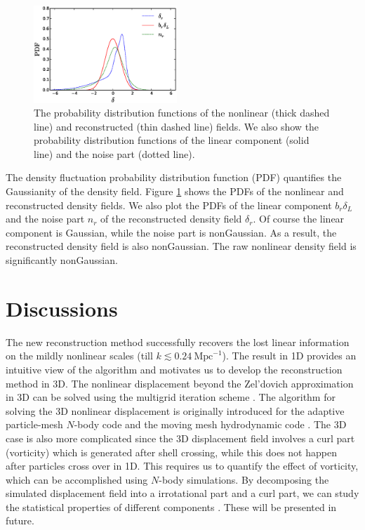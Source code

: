 \documentclass[aps,prd,twocolumn,showpacs,superscriptaddress,groupedaddress,nofootinbib]{revtex4}  %
\newcommand{\mr}{\mathrm}
\begin{document}
\begin{figure}[tbp]
\begin{center}
\includegraphics[width=0.48\textwidth]{f8x.eps}
\end{center}
\vspace{-0.7cm}
\caption{The probability distribution functions of the nonlinear (thick dashed 
line) and reconstructed (thin dashed line) fields. 
We also show the probability distribution functions of the linear component 
(solid line) and the noise part (dotted line).}
\label{fig:pdf}
\end{figure}

The density fluctuation probability distribution function (PDF) quantifies the 
Gaussianity of the density field. Figure \ref{fig:pdf} shows the PDFs of
the nonlinear and reconstructed density fields. We also plot the PDFs of the
linear component $b_r\delta_L$ and the noise part $n_r$ of the reconstructed 
density field $\delta_r$. Of course the linear component is Gaussian, while 
the noise part is nonGaussian. As a result, the reconstructed density field is 
also nonGaussian. The raw nonlinear density field is significantly nonGaussian.


\section{ Discussions}
\label{dis}
The new reconstruction method successfully recovers the lost linear information 
on the mildly nonlinear scales (till $k\lesssim0.24\ \mr{Mpc}^{-1}$).
The result in 1D provides an intuitive view of the algorithm and motivates us to
develop the reconstruction method in 3D. The nonlinear displacement beyond the
Zel'dovich approximation in 3D can be solved using the multigrid
iteration scheme \cite{1995ApJS..100..269P}. The algorithm 
for solving the 3D nonlinear displacement is originally introduced for the 
adaptive particle-mesh $N$-body code \cite{1995ApJS..100..269P} 
and the moving mesh hydrodynamic code \cite{1998ApJS..115...19P}.
The 3D case is also more complicated since the 3D displacement field involves
a curl part (vorticity) which is generated after shell crossing, 
while this does not happen after particles cross over in 1D. 
This requires us to quantify the effect of vorticity, which can be accomplished
using $N$-body simulations. 
By decomposing the simulated displacement field into a irrotational part and
a curl part, we can study the statistical properties of different components
\cite{2013PhRvD..87f3526Z,2013PhRvD..88j3510Z}.
These will be presented in future.
\end{document}
